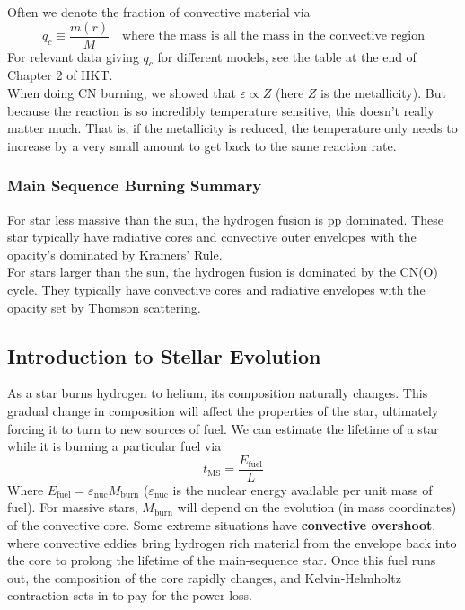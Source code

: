 \documentclass[10pt]{article}
\numberwithin{equation}{section}
\newcommand{\n}{\noindent}
\begin{document}
    \n Often we denote the fraction of convective material via
    \begin{equation}
      \label{eq:192}
      q_c\equiv \frac{m(r)}{M} \quad\textrm{where the mass is all the
        mass in the convective region}
    \end{equation}
    For relevant data giving $q_c$ for different models, see the table
    at the end of Chapter 2 of HKT.\\

    \n When doing CN burning, we showed that $\varepsilon\propto Z$
    (here $Z$ is the metallicity). But because the reaction is so
    incredibly temperature sensitive, this doesn't really matter
    much. That is, if the metallicity is reduced, the temperature only
    needs to increase by a very small amount to get back to the same
    reaction rate.

    \subsubsection{Main Sequence Burning Summary}
    \label{sec:main-sequ-burn}

    For star less massive than the sun, the hydrogen fusion is pp
    dominated. These star typically have radiative cores and
    convective outer envelopes with the opacity's dominated by
    Kramers' Rule.\\

    \n For stars larger than the sun, the hydrogen fusion is dominated
    by the CN(O) cycle. They typically have convective cores and
    radiative envelopes with the opacity set by Thomson scattering.

    \subsection{Introduction to Stellar Evolution}
    \label{sec:stellar-evolution}

    As a star burns hydrogen to helium, its composition naturally
    changes. This gradual change in composition will affect the
    properties of the star, ultimately forcing it to turn to new
    sources of fuel. We can estimate the lifetime of a star while it
    is burning a particular fuel via
    \begin{equation}
      \label{eq:193}
      t_{\mathrm{MS}}=\frac{E_{\mathrm{fuel}}}{L}
    \end{equation}
    Where
    $E_{\mathrm{fuel}}=\varepsilon_{\mathrm{nuc}}M_{\mathrm{burn}}$
    ($\varepsilon_{\mathrm{nuc}}$ is the nuclear energy available per
    unit mass of fuel). For massive stars, $M_{\mathrm{burn}}$ will
    depend on the evolution (in mass coordinates) of the convective
    core. Some extreme situations have \textbf{convective overshoot},
    where convective eddies bring hydrogen rich material from the
    envelope back into the core to prolong the lifetime of the
    main-sequence star. Once this fuel runs out, the composition of
    the core rapidly changes, and Kelvin-Helmholtz contraction sets in
    to pay for the power loss.\\
\end{document}
